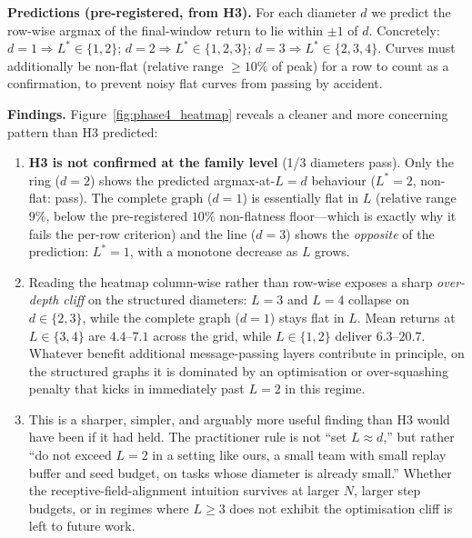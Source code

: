 \documentclass[10pt]{article}
\begin{document}
\textbf{Predictions (pre-registered, from H3).}
For each diameter $d$ we predict the row-wise argmax of the
final-window return to lie within $\pm 1$ of $d$. Concretely:
$d=1 \Rightarrow L^* \in \{1, 2\}$; $d=2 \Rightarrow L^* \in \{1, 2, 3\}$;
$d=3 \Rightarrow L^* \in \{2, 3, 4\}$. Curves must additionally be non-flat
(relative range $\ge 10\%$ of peak) for a row to count as a confirmation,
to prevent noisy flat curves from passing by accident.



\textbf{Findings.} Figure~\ref{fig:phase4_heatmap} reveals a cleaner and more concerning pattern than H3 predicted:

\begin{enumerate}[leftmargin=*,itemsep=0pt,topsep=2pt]
  \item \textbf{H3 is not confirmed at the family level} (1/3 diameters
        pass). Only the ring ($d=2$) shows the predicted argmax-at-$L=d$
        behaviour ($L^*=2$, non-flat: pass). The complete graph
        ($d=1$) is essentially flat in $L$ (relative range $9\%$, below the
        pre-registered $10\%$ non-flatness floor---which is exactly why it
        fails the per-row criterion) and the line ($d=3$) shows the
        \emph{opposite} of the prediction: $L^*=1$, with a monotone
        decrease as $L$ grows.
  \item Reading the heatmap column-wise rather than row-wise exposes a
        sharp \emph{over-depth cliff} on the structured diameters: $L=3$
        and $L=4$ collapse on $d \in \{2, 3\}$, while the complete graph
        ($d=1$) stays flat in $L$. Mean returns at $L \in \{3, 4\}$ are
        $4.4$--$7.1$ across the grid, while $L \in \{1, 2\}$ deliver
        $6.3$--$20.7$. Whatever benefit additional message-passing layers
        contribute in principle, on the structured graphs it is dominated
        by an optimisation or
        over-squashing penalty that kicks in immediately past $L=2$ in
        this regime.
  \item This is a sharper, simpler, and arguably more useful finding
        than H3 would have been if it had held. The practitioner rule
        is not ``set $L \approx d$,'' but rather ``do not exceed
        $L = 2$ in a setting like ours, a small team with small
        replay buffer and seed budget, on tasks whose diameter is
        already small.'' Whether the receptive-field-alignment intuition
        survives at larger $N$, larger step budgets, or in regimes where
        $L \ge 3$ does not exhibit the optimisation cliff is left to
        future work.
\end{enumerate}
\end{document}
